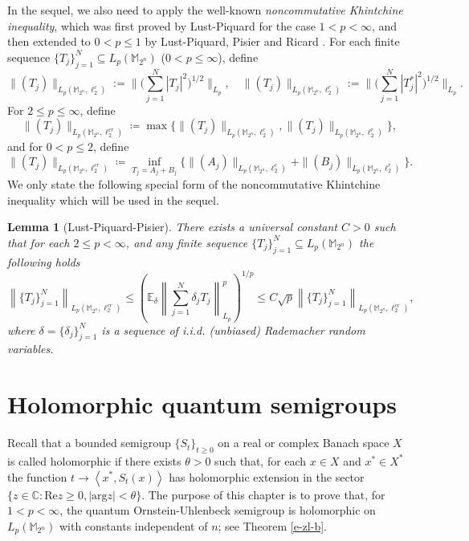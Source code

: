 \documentclass{amsbook}
\newtheorem{lemma}[theorem]{Lemma}
\theoremstyle{definition}
\theoremstyle{remark}
\numberwithin{section}{chapter}
\numberwithin{equation}{chapter}
\newcommand{\M}{\mathbb{M}}
\newcommand{\1}{\mathbf{1}}
\begin{document}
In the sequel, we also need to apply the well-known \emph{noncommutative Khintchine inequality}, which was first proved by Lust-Piquard \cite{Lu1986} for the case $1<p<\infty$, and then extended to $0<p\leq 1$ by  Lust-Piquard, Pisier and Ricard \cite{LuP1991, PR2017}. For each finite sequence $\{T_{j}\}_{j=1}^{N}\subseteq L_p(\mathbb{M}_{2^n})$ ($0<p\leq \infty$), define 
$$\|(T_j)\|_{L_p(\mathbb{M}_{2^n}, \ell_2^c)}:=\Big\|\Big(\sum_{j=1}^{N}|T_j|^2\Big)^{1/2}\Big\|_{L_{p}},\quad \|(T_j)\|_{L_p(\mathbb{M}_{2^n}, \ell_2^r)}:=\Big\|\Big(\sum_{j=1}^{N}|T_j^*|^2\Big)^{1/2}\Big\|_{L_{p}}.$$
For $2\leq p\leq \infty$, define 
$$\|(T_j)\|_{L_p(\mathbb{M}_{2^n}, \ell_2^{cr})}\coloneqq \max\{\|(T_j)\|_{L_p(\mathbb{M}_{2^n}, \ell_2^c)},\|(T_j)\|_{L_p(\mathbb{M}_{2^n}, \ell_2^r)}\},$$
and for $0<p\leq 2$, define
$$\|(T_j)\|_{L_p(\mathbb{M}_{2^n}, \ell_2^{cr})}\coloneqq \inf_{T_j=A_j+B_j}\{\|(A_j)\|_{L_p(\mathbb{M}_{2^n}, \ell_2^c)}+\|(B_j)\|_{L_p(\mathbb{M}_{2^n}, \ell_2^r)}\}.$$
We only state the following special form of the noncommutative Khintchine inequality which will be used in the sequel.

\begin{lemma}[Lust-Piquard-Pisier]\label{nc-kh}
There exists a universal constant $C>0$ such that for each $2\leq p <\infty$, and any finite sequence $\{T_{j}\}_{j=1}^{N}\subseteq L_p(\mathbb{M}_{2^n})$ the following holds
\[
\left\|\{T_{j}\}_{j=1}^{N}\right\|_{L_p(\mathbb{M}_{2^n}, \ell_2^{cr})}\leq  \left(\mathbb{E}_{\delta}\left\|\sum_{j=1}^{N}\delta_{j} T_{j}\right\|_{L_{p}}^p\right)^{1/p}\leq C \sqrt{p}\left\|\{T_{j}\}_{j=1}^{N}\right\|_{L_p(\mathbb{M}_{2^n}, \ell_2^{cr})},
\]
where $\delta=\{\delta_{j}\}_{j=1}^{N}$ is a sequence of i.i.d. (unbiased) Rademacher random variables.
\end{lemma}
\chapter{Holomorphic quantum semigroups}\label{sec-hqs}

Recall that a bounded semigroup $\{S_{t}\}_{t\geq 0}$ on a real or complex Banach space $X$ is called holomorphic if there exists $\theta>0$ such that, for each $x\in X$ and $x^*\in X^*$
the function $t\rightarrow \left\langle x^*,S_t(x)\right\rangle$ has holomorphic extension in the sector $\{z\in\mathbb{C}:  \mathrm{Re}z\geq0,|\mathrm{arg}z|<\theta\}$. The purpose of this chapter is to prove that, for $1<p<\infty$, the quantum Ornstein-Uhlenbeck semigroup is holomorphic on $L_p(\M_{2^n})$ with constants independent of $n$; see Theorem \ref{e-zl-b}.
\end{document}
